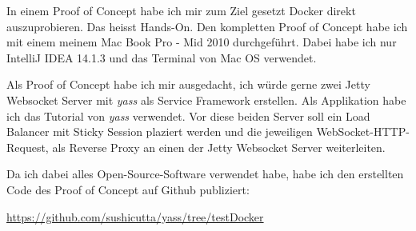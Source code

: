 In einem Proof of Concept habe ich mir zum Ziel gesetzt Docker direkt auszuprobieren. Das heisst
Hands-On. Den kompletten Proof of Concept habe ich mit einem meinem Mac Book Pro - Mid 2010 durchgeführt.
Dabei habe ich nur IntelliJ IDEA 14.1.3 und das Terminal von Mac OS verwendet.

Als Proof of Concept habe ich mir ausgedacht, ich würde gerne zwei Jetty Websocket Server
mit \textit{yass} als Service Framework erstellen. Als Applikation habe ich das Tutorial
von \textit{yass} verwendet. Vor diese beiden Server soll ein Load Balancer mit
Sticky Session plaziert werden und die jeweiligen WebSocket-HTTP-Request, als Reverse Proxy
an einen der Jetty Websocket Server weiterleiten.

Da ich dabei alles Open-Source-Software verwendet habe, habe ich den erstellten Code des Proof
of Concept auf Github publiziert:

\url{https://github.com/sushicutta/yass/tree/testDocker}



